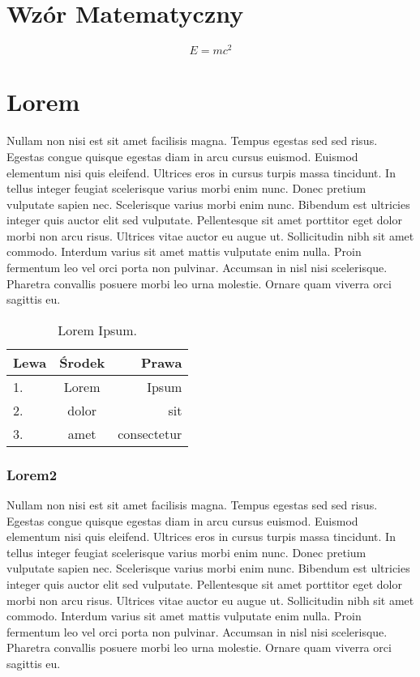 \documentclass[12pt, a4paper]{article}
\begin{document}
\section{Wzór Matematyczny}
 $$E=mc^2$$




\section{Lorem}
Nullam non nisi est sit amet facilisis magna. Tempus egestas sed sed risus. Egestas congue quisque egestas diam in arcu cursus euismod. Euismod elementum nisi quis eleifend. Ultrices eros in cursus turpis massa tincidunt. In tellus integer feugiat scelerisque varius morbi enim nunc. Donec pretium vulputate sapien nec. Scelerisque varius morbi enim nunc. Bibendum est ultricies integer quis auctor elit sed vulputate. Pellentesque sit amet porttitor eget dolor morbi non arcu risus. Ultrices vitae auctor eu augue ut. Sollicitudin nibh sit amet commodo. Interdum varius sit amet mattis vulputate enim nulla.
Proin fermentum leo vel orci porta non pulvinar. Accumsan in nisl nisi scelerisque. Pharetra convallis posuere morbi leo urna molestie. Ornare quam viverra orci sagittis eu. 

\begin{table}[ht]
  \centering
  \begin{tabular}{|l|c|r|}
    \hline
    Lewa & Środek & Prawa \\ \hline
    1. & Lorem & Ipsum \\ \hline
    2. & dolor & sit \\ \hline
    3. & amet & consectetur \\ \hline
  \end{tabular}
  \caption{Lorem Ipsum.}
\end{table}

\subsubsection{Lorem2}
Nullam non nisi est sit amet facilisis magna. Tempus egestas sed sed risus. Egestas congue quisque egestas diam in arcu cursus euismod. Euismod elementum nisi quis eleifend. Ultrices eros in cursus turpis massa tincidunt. In tellus integer feugiat scelerisque varius morbi enim nunc. Donec pretium vulputate sapien nec. Scelerisque varius morbi enim nunc. Bibendum est ultricies integer quis auctor elit sed vulputate. Pellentesque sit amet porttitor eget dolor morbi non arcu risus. Ultrices vitae auctor eu augue ut. Sollicitudin nibh sit amet commodo. Interdum varius sit amet mattis vulputate enim nulla.
Proin fermentum leo vel orci porta non pulvinar. Accumsan in nisl nisi scelerisque. Pharetra convallis posuere morbi leo urna molestie. Ornare quam viverra orci sagittis eu.
\end{document}
